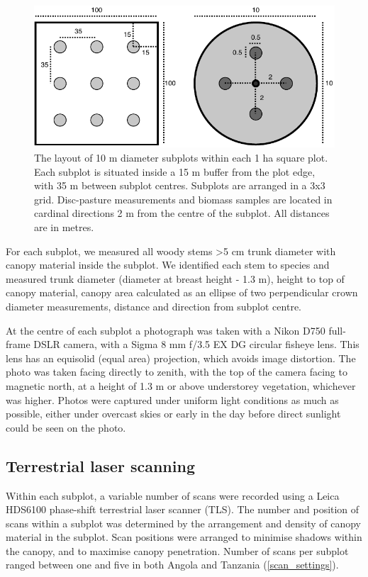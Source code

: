 \documentclass[11pt,a4paper]{article}
\begin{document}
\begin{figure}[H]
\centering
	\includegraphics[width=\textwidth]{subplot}
	\caption{The layout of 10 m diameter subplots within each 1 ha square plot. Each subplot is situated inside a 15 m buffer from the plot edge, with 35 m between subplot centres. Subplots are arranged in a 3x3 grid. Disc-pasture measurements and biomass samples are located in cardinal directions 2 m from the centre of the subplot. All distances are in metres.}
	\label{subplot}
\end{figure}

For each subplot, we measured all woody stems >5 cm trunk diameter with canopy material inside the subplot. We identified each stem to species and measured trunk diameter (diameter at breast height - 1.3 m), height to top of canopy material, canopy area calculated as an ellipse of two perpendicular crown diameter measurements, distance and direction from subplot centre.

At the centre of each subplot a photograph was taken with a Nikon D750 full-frame DSLR camera, with a Sigma 8 mm f/3.5 EX DG circular fisheye lens. This lens has an equisolid (equal area) projection, which avoids image distortion. The photo was taken facing directly to zenith, with the top of the camera facing to magnetic north, at a height of 1.3 m or above understorey vegetation, whichever was higher. Photos were captured under uniform light conditions as much as possible, either under overcast skies or early in the day before direct sunlight could be seen on the photo. 

\subsection{Terrestrial laser scanning}

Within each subplot, a variable number of scans were recorded using a Leica HDS6100 phase-shift terrestrial laser scanner (TLS). The number and position of scans within a subplot was determined by the arrangement and density of canopy material in the subplot. Scan positions were arranged to minimise shadows within the canopy, and to maximise canopy penetration. Number of scans per subplot ranged between one and five in both Angola and Tanzania (\autoref{scan_settings}).
\end{document}
